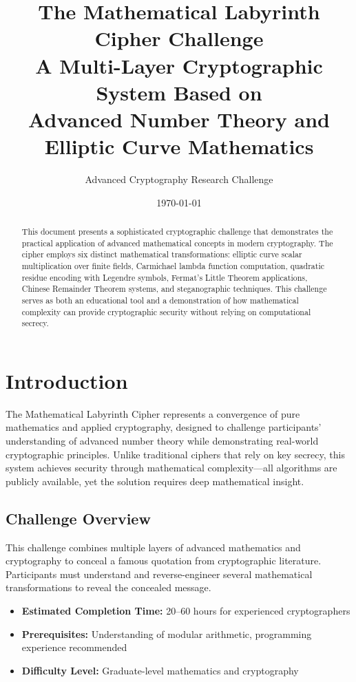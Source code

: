 \documentclass[11pt,a4paper]{article}
\title{\textbf{The Mathematical Labyrinth Cipher Challenge}\\
\large{A Multi-Layer Cryptographic System Based on\\Advanced Number Theory and Elliptic Curve Mathematics}}
\author{Advanced Cryptography Research Challenge}
\date{\today}
\begin{document}
\maketitle

\begin{abstract}
This document presents a sophisticated cryptographic challenge that demonstrates the practical application of advanced mathematical concepts in modern cryptography. The cipher employs six distinct mathematical transformations: elliptic curve scalar multiplication over finite fields, Carmichael lambda function computation, quadratic residue encoding with Legendre symbols, Fermat's Little Theorem applications, Chinese Remainder Theorem systems, and steganographic techniques. This challenge serves as both an educational tool and a demonstration of how mathematical complexity can provide cryptographic security without relying on computational secrecy.
\end{abstract}

\section{Introduction}

The Mathematical Labyrinth Cipher represents a convergence of pure mathematics and applied cryptography, designed to challenge participants' understanding of advanced number theory while demonstrating real-world cryptographic principles. Unlike traditional ciphers that rely on key secrecy, this system achieves security through mathematical complexity—all algorithms are publicly available, yet the solution requires deep mathematical insight.

\subsection{Challenge Overview}

This challenge combines multiple layers of advanced mathematics and cryptography to conceal a famous quotation from cryptographic literature. Participants must understand and reverse-engineer several mathematical transformations to reveal the concealed message.

\begin{itemize}
    \item \textbf{Estimated Completion Time:} 20--60 hours for experienced cryptographers
    \item \textbf{Prerequisites:} Understanding of modular arithmetic, programming experience recommended
    \item \textbf{Difficulty Level:} Graduate-level mathematics and cryptography
\end{itemize}
\end{document}
